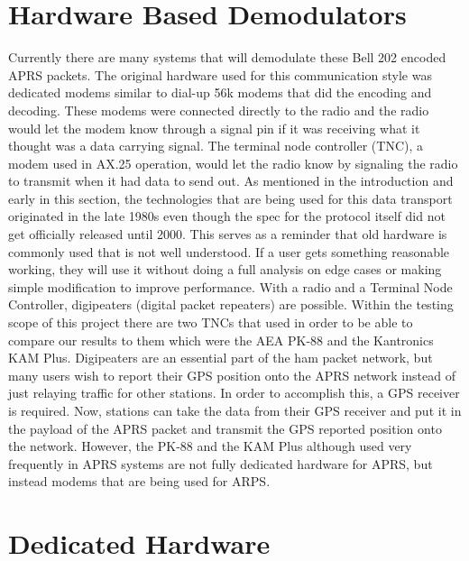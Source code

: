\section{Hardware Based Demodulators}

Currently there are many systems that will demodulate these Bell 202 encoded APRS packets. The original hardware used for this communication style was dedicated modems similar to dial-up 56k modems that did the encoding and decoding. These modems were connected directly to the radio and the radio would let the modem know through a signal pin if it was receiving what it thought was a data carrying signal. The terminal node controller (TNC), a modem used in AX.25 operation, would let the radio know by signaling the radio to transmit when it had data to send out. As mentioned in the introduction and early in this section, the technologies that are being used for this data transport originated in the late 1980s even though the spec for the protocol itself did not get officially released until 2000. This serves as a reminder that old hardware is commonly used that is not well understood. If a user gets something reasonable working, they will use it without doing a full analysis on edge cases or making simple modification to improve performance.
With a radio and a Terminal Node Controller, digipeaters (digital packet repeaters) are possible. Within the testing scope of this project there are two TNCs that used in order to be able to compare our results to them which were the AEA PK-88 and the Kantronics KAM Plus. Digipeaters are an essential part of the ham packet network, but many users wish to report their GPS position onto the APRS network instead of just relaying traffic for other stations. In order to accomplish this, a GPS receiver is required. Now, stations can take the data from their GPS receiver and put it in the payload of the APRS packet and transmit the GPS reported position onto the network. However, the PK-88 and the KAM Plus although used very frequently in APRS systems are not fully dedicated hardware for APRS, but instead modems that are being used for ARPS.

\section{Dedicated Hardware}

